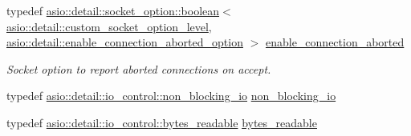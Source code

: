 \begin{DoxyCompactItemize}
\item 
typedef \hyperlink{classasio_1_1detail_1_1socket__option_1_1boolean}{asio\+::detail\+::socket\+\_\+option\+::boolean}$<$ \hyperlink{namespaceasio_1_1detail_ac87c0ec12e7071c1f18513b04a627a24}{asio\+::detail\+::custom\+\_\+socket\+\_\+option\+\_\+level}, \hyperlink{namespaceasio_1_1detail_a4d541df87cf6415ae4d57937476bb361}{asio\+::detail\+::enable\+\_\+connection\+\_\+aborted\+\_\+option} $>$ \hyperlink{classasio_1_1socket__base_a9787312b9387d5bdc761f6b6d4530830}{enable\+\_\+connection\+\_\+aborted}
\begin{DoxyCompactList}\small\item\em Socket option to report aborted connections on accept. \end{DoxyCompactList}\item 
typedef \hyperlink{classasio_1_1detail_1_1io__control_1_1non__blocking__io}{asio\+::detail\+::io\+\_\+control\+::non\+\_\+blocking\+\_\+io} \hyperlink{classasio_1_1socket__base_ab4de0f3662c5f485d867da65d30e7e8b}{non\+\_\+blocking\+\_\+io}
\item 
typedef \hyperlink{classasio_1_1detail_1_1io__control_1_1bytes__readable}{asio\+::detail\+::io\+\_\+control\+::bytes\+\_\+readable} \hyperlink{classasio_1_1socket__base_acf399372b78fa9a6ad04a297202c2fac}{bytes\+\_\+readable}
\end{DoxyCompactItemize}

